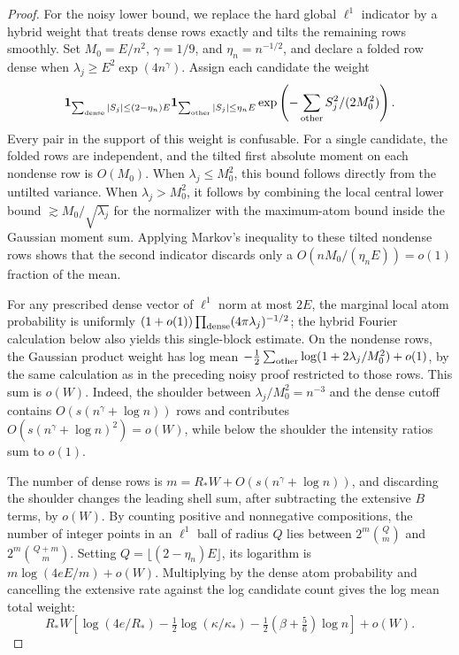\begin{proof}
For the noisy lower bound, we replace the hard global \(\ell^1\) indicator by a hybrid weight that treats dense rows exactly and tilts the remaining rows smoothly. Set \(M_0=E/n^2\), \(\gamma=1/9\), and \(\eta_n=n^{-1/2}\), and declare a folded row dense when \(\lambda_j\ge E^2\exp(4n^\gamma)\). Assign each candidate the weight
\[
 \mathbf1_{\sum_{\rm dense}|S_j|\le (2-\eta_n)E}
 \mathbf1_{\sum_{\rm other}|S_j|\le \eta_n E}
 \exp\left(-\sum_{\rm other} S_j^2/(2M_0^2)\right).
\]
Every pair in the support of this weight is confusable. For a single candidate, the folded rows are independent, and the tilted first absolute moment on each nondense row is \(O(M_0)\). When \(\lambda_j\le M_0^2\), this bound follows directly from the untilted variance. When \(\lambda_j>M_0^2\), it follows by combining the local central lower bound \(\gtrsim M_0/\sqrt{\lambda_j}\) for the normalizer with the maximum-atom bound inside the Gaussian moment sum. Applying Markov's inequality to these tilted nondense rows shows that the second indicator discards only a \(O(n M_0/(\eta_n E))=o(1)\) fraction of the mean.

For any prescribed dense vector of \(\ell^1\) norm at most \(2E\), the marginal local atom probability is uniformly \((1+o(1))\prod_{\rm dense}(4\pi\lambda_j)^{-1/2}\); the hybrid Fourier calculation below also yields this single-block estimate. On the nondense rows, the Gaussian product weight has log mean \(-\tfrac12\sum_{\rm other}\log(1+2\lambda_j/M_0^2)+o(1)\), by the same calculation as in the preceding noisy proof restricted to those rows. This sum is \(o(W)\). Indeed, the shoulder between \(\lambda_j/M_0^2=n^{-3}\) and the dense cutoff contains \(O(s(n^\gamma+\log n))\) rows and contributes \(O(s(n^\gamma+\log n)^2)=o(W)\), while below the shoulder the intensity ratios sum to \(o(1)\).

The number of dense rows is \(m=R_*W+O(s(n^\gamma+\log n))\), and discarding the shoulder changes the leading shell sum, after subtracting the extensive \(B\) terms, by \(o(W)\). By counting positive and nonnegative compositions, the number of integer points in an \(\ell^1\) ball of radius \(Q\) lies between \(2^m\binom Qm\) and \(2^m\binom{Q+m}{m}\). Setting \(Q=\lfloor(2-\eta_n)E\rfloor\), its logarithm is \(m\log(4eE/m)+o(W)\). Multiplying by the dense atom probability and cancelling the extensive rate against the log candidate count gives the log mean total weight:
\[
 R_*W\left[
 \log(4e/R_*)-\tfrac12\log(\kappa/\kappa_*)
                -\tfrac12(\beta+\tfrac56)\log n
 \right]+o(W).
\]


\end{proof}
